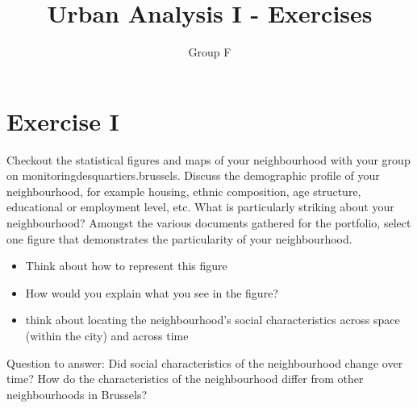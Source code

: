 \documentclass{article}
\title{Urban Analysis I - Exercises}
\author{Group F}
\begin{document}
\maketitle

\section{Exercise I}

Checkout the statistical figures and maps of your neighbourhood with your group on monitoringdesquartiers.brussels. Discuss the demographic profile of your neighbourhood, for example housing, ethnic composition, age structure, educational or employment level, etc. What is particularly striking about your neighbourhood? Amongst the various documents gathered for the portfolio, select one figure that demonstrates the particularity of your neighbourhood. 

\begin{itemize}
	\item Think about how to represent this figure
	\item How would you explain what you see in the figure?
	\item think about locating the neighbourhood's social characteristics across space (within the city) and across time
\end{itemize}

Question to answer: Did social characteristics of the neighbourhood change over time? How do the characteristics of the neighbourhood differ from other neighbourhoods in Brussels?
\end{document}
